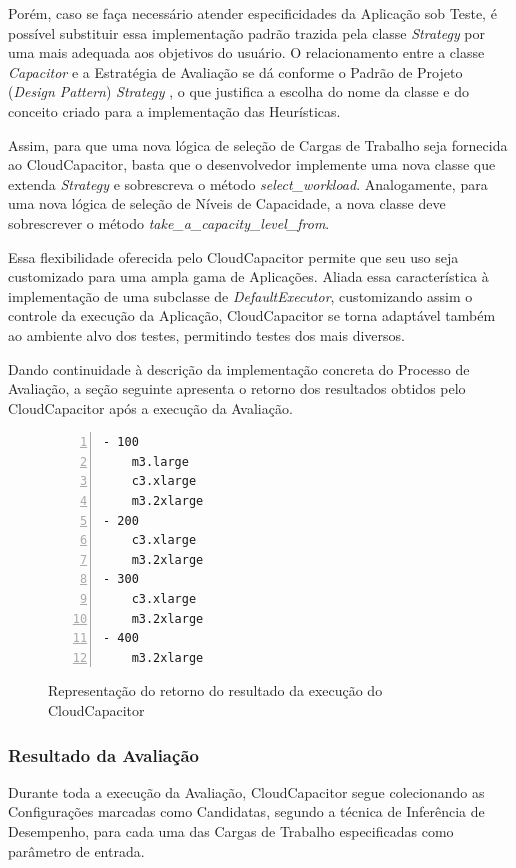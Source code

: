 Porém, caso se faça necessário atender especificidades da Aplicação sob Teste, 
é possível substituir essa implementação padrão trazida pela classe \emph{Strategy} 
por uma mais adequada aos objetivos do usuário. O relacionamento entre a classe 
\emph{Capacitor} e a Estratégia de Avaliação se dá conforme o Padrão de Projeto 
(\emph{Design Pattern}) \emph{Strategy} \cite{gamma}, o que justifica a escolha 
do nome da classe e do conceito criado para a implementação das Heurísticas.

Assim, para que uma nova lógica de seleção de Cargas de Trabalho seja fornecida
ao CloudCapacitor, basta que o desenvolvedor implemente uma nova classe que extenda
\emph{Strategy} e sobrescreva o método \emph{select\_workload}. Analogamente,
para uma nova lógica de seleção de Níveis de Capacidade, a nova classe deve 
sobrescrever o método \emph{take\_a\_capacity\_level\_from}.

Essa flexibilidade oferecida pelo CloudCapacitor permite que seu uso seja 
customizado para uma ampla gama de Aplicações. Aliada essa característica à 
implementação de uma subclasse de \emph{DefaultExecutor}, customizando assim o 
controle da execução da Aplicação, CloudCapacitor se torna adaptável também ao
ambiente alvo dos testes, permitindo testes dos mais diversos.

Dando continuidade à descrição da implementação concreta do Processo de Avaliação,
a seção seguinte apresenta o retorno dos resultados obtidos pelo CloudCapacitor
após a execução da Avaliação.

\begin{figure}[h]
  \caption{\label{fig:resultado}Representação do retorno do resultado da execução do CloudCapacitor}
 \begin{lstlisting}[linewidth=\textwidth,xleftmargin=.04\textwidth, numbers=left]
- 100
    m3.large
    c3.xlarge
    m3.2xlarge
- 200
    c3.xlarge
    m3.2xlarge
- 300
    c3.xlarge
    m3.2xlarge
- 400
    m3.2xlarge
  \end{lstlisting}
\end{figure}

\subsubsection{Resultado da Avaliação}
\label{subsubsec:funcionamento_resultado}
Durante toda a execução da Avaliação, CloudCapacitor segue colecionando as
Configurações marcadas como Candidatas, segundo a técnica de Inferência de 
Desempenho, para cada uma das Cargas de Trabalho especificadas como parâmetro de 
entrada.

